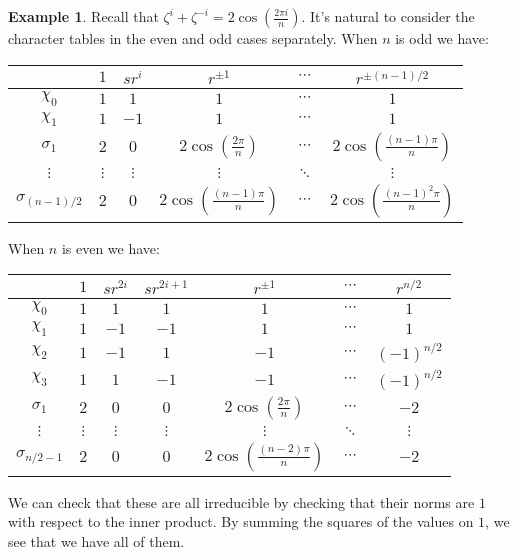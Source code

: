 \documentclass[12pt]{article}
\theoremstyle{plain}
\theoremstyle{definition}
\newtheorem{example}[theorem]{Example}
\theoremstyle{remark}
\numberwithin{equation}{section}
\begin{document}
\begin{example}
Recall that $\zeta^i+\zeta^{-i}=2\cos(\frac{2\pi i}{n})$.
It's natural to consider the character tables in the even and odd
cases separately.
When $n$ is odd we have:
\begin{center}
\begin{tabular}{|c|c|c|c|c|c|}
\hline 
 & $1$ & $sr^i$ & $r^{\pm 1}$ & $\cdots$ & $r^{\pm (n-1)/2}$\\
\hline 
\hline 
$\chi_0$ & $1$ & $1$ & $1$ & $\cdots$ & $1$\\
\hline 
$\chi_1$ & $1$ & $-1$ & $1$ & $\cdots$ & $1$\\
\hline 
$\sigma_{1}$ & $2$ & $0$ & $2\cos\left(\frac{2\pi}{n}\right)$ & $\cdots$
& $2\cos\left(\frac{ (n-1) \pi}{n}\right)$\\
\hline 
$\vdots$ & $\vdots$ & $\vdots$ & $\vdots$ & $\ddots$ & $\vdots$\\
\hline
$\sigma_{(n-1)/2}$ & $2$ & $0$ & $2\cos\left(\frac{(n-1)\pi}{n}\right)$
& $\cdots$ & $2\cos\left(\frac{ (n-1)^2 \pi}{n}\right)$\\
\hline
\end{tabular}
\end{center}
When $n$ is even we have:
\begin{center}
\begin{tabular}{|c|c|c|c|c|c|c|}
\hline 
 & $1$ & $sr^{2i}$ & $sr^{2i+1}$ & $r^{\pm 1}$ & $\cdots$ & $r^{n/2}$\\
\hline 
\hline 
$\chi_0$ & $1$ & $1$ & $1$ & $1$ & $\cdots$ &  $1$\\
\hline 
$\chi_1$ & $1$ & $-1$ & $-1$ & $1$ & $\cdots$ & $1$\\
\hline 
$\chi_2$ & $1$ & $-1$ & $1$ & $-1$ & $\cdots$ &
$(-1)^{n/2}$\\
\hline 
$\chi_3$ & $1$ & $1$ & $-1$ & $-1$ & $\cdots$ & $(-1)^{n/2}$\\
\hline 
$\sigma_{1}$ & $2$ & $0$ & $0$ & $2\cos\left(\frac{2\pi}{n}\right)$ & $\cdots$
 & $-2$\\
\hline 
$\vdots$ & $\vdots$ & $\vdots$ & $\vdots$ & $\vdots$ & $\ddots$ & $\vdots$\\
\hline
$\sigma_{n/2-1}$ & $2$ & $0$ & $0$ &
$2\cos\left(\frac{(n-2)\pi}{n}\right)$ & $\cdots$ & $-2$\\
\hline
\end{tabular}
\end{center}
We can check that these are all irreducible by checking that their norms
are $1$ with respect to the inner product.  By summing the squares of
the values on $1$, we see that we have all of them. 
\end{example}
\end{document}
